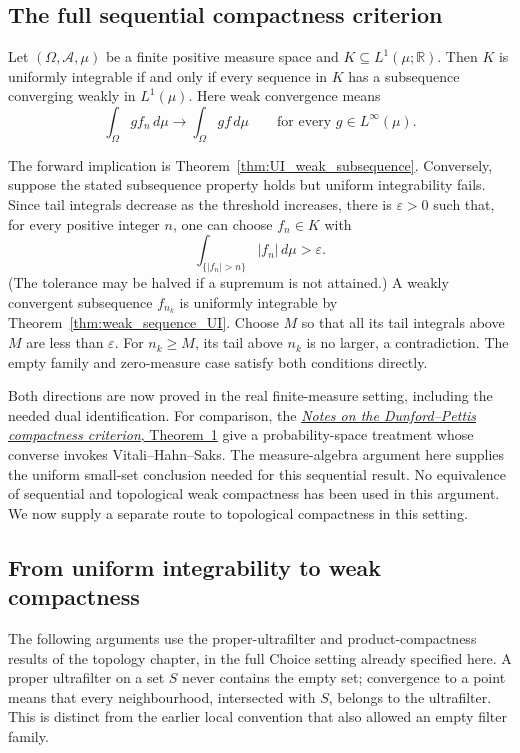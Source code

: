 \subsection{The full sequential compactness criterion}
\begin{theorem}
\label{thm:DP_sequential_finite}
Let $(\Omega,\mathcal A,\mu)$ be a finite positive measure space and
$K\subseteq L^1(\mu;\mathbb R)$. Then $K$ is uniformly integrable
if and only if
every sequence in $K$ has a subsequence converging weakly in $L^1(\mu)$.
Here weak convergence means
\[
\int_\Omega gf_n\,d\mu\longrightarrow\int_\Omega gf\,d\mu
\qquad\text{for every }g\in L^\infty(\mu).
\]
\end{theorem}
\Proof
The forward implication is Theorem~\ref{thm:UI_weak_subsequence}.
Conversely, suppose the stated subsequence property holds but uniform
integrability fails. Since tail integrals decrease as the threshold
increases, there is $\varepsilon>0$ such that, for every positive integer
$n$, one can choose $f_n\in K$ with
\[
\int_{\{|f_n|>n\}}|f_n|\,d\mu>\varepsilon.
\]
(The tolerance may be halved if a supremum is not attained.)
A weakly convergent subsequence $f_{n_k}$ is uniformly integrable by
Theorem~\ref{thm:weak_sequence_UI}. Choose $M$ so that all its tail integrals above $M$
are less than $\varepsilon$. For $n_k\geq M$, its tail above $n_k$ is
no larger, a contradiction. The empty family and zero-measure case
satisfy both conditions directly.
\Done

Both directions are now proved in the real finite-measure setting,
including the needed dual identification. For comparison, the
\href{https://sites.math.rutgers.edu/courses/592/dunfordpettis.pdf}
{\emph{Notes on the Dunford--Pettis compactness criterion}, Theorem~1}
give a probability-space treatment whose converse invokes
Vitali--Hahn--Saks. The measure-algebra argument here supplies the
uniform small-set conclusion needed for this sequential result.
No equivalence of sequential and topological weak compactness has been
used in this argument. We now supply a separate route to topological
compactness in this setting.
\subsection{From uniform integrability to weak compactness}
The following arguments use the proper-ultrafilter and product-compactness
results of the topology chapter, in the full Choice setting already
specified here. A proper ultrafilter on a set $S$ never contains the empty
set; convergence to a point means that every neighbourhood, intersected
with $S$, belongs to the ultrafilter. This is distinct from the earlier
local convention that also allowed an empty filter family.

